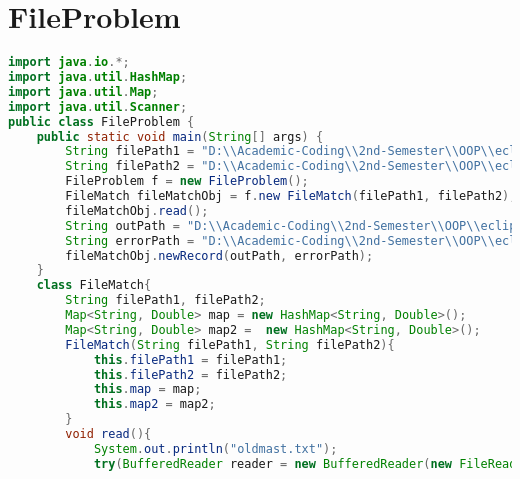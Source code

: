 \documentclass{article}
\begin{document}
\section{FileProblem}
\begin{lstlisting}[language=Java, caption=FileProblem]
import java.io.*;
import java.util.HashMap;
import java.util.Map;
import java.util.Scanner;
public class FileProblem {	
	public static void main(String[] args) {
		String filePath1 = "D:\\Academic-Coding\\2nd-Semester\\OOP\\eclipse-workplace\\LabExamPractice\\src\\oldmast.txt";
		String filePath2 = "D:\\Academic-Coding\\2nd-Semester\\OOP\\eclipse-workplace\\LabExamPractice\\src\\trans.txt";
		FileProblem f = new FileProblem();
		FileMatch fileMatchObj = f.new FileMatch(filePath1, filePath2);
		fileMatchObj.read();
		String outPath = "D:\\Academic-Coding\\2nd-Semester\\OOP\\eclipse-workplace\\LabExamPractice\\src\\newmast.txt";
		String errorPath = "D:\\Academic-Coding\\2nd-Semester\\OOP\\eclipse-workplace\\LabExamPractice\\src\\log.txt";;
		fileMatchObj.newRecord(outPath, errorPath);
	}
	class FileMatch{
		String filePath1, filePath2;
		Map<String, Double> map = new HashMap<String, Double>();
		Map<String, Double> map2 =  new HashMap<String, Double>();
		FileMatch(String filePath1, String filePath2){
			this.filePath1 = filePath1;
			this.filePath2 = filePath2;
			this.map = map;
			this.map2 = map2;
		}
		void read(){
			System.out.println("oldmast.txt");
			try(BufferedReader reader = new BufferedReader(new FileReader(filePath1))){

\end{lstlisting}
\end{document}
